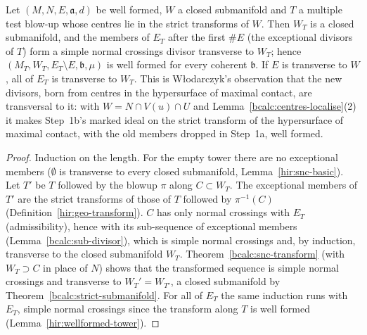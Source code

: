\begin{lemma}
\label{bcalc:exceptional-transverse-tower}
\historicalleanok
Let \((M,N,E,\mathfrak a,d)\) be well formed, \(W\) a closed submanifold and \(T\) a multiple test blow-up whose centres lie in the strict transforms of \(W\).
Then \(W_T\) is a closed submanifold, and the members of \(E_T\) after the first \(\#E\) (the exceptional divisors of \(T\)) form a simple normal crossings
divisor transverse to \(W_T\); hence \((M_T,W_T,E_T\setminus E,\mathfrak b,\mu)\) is well formed for every coherent \(\mathfrak b\). If \(E\) is transverse to \(W\),
all of \(E_T\) is transverse to \(W_T\). This is Włodarczyk's observation that the new divisors, born from centres in the hypersurface of maximal contact,
are transversal to it: with \(W=N\cap V(u)\cap U\) and Lemma~\ref{bcalc:centres-localise}(2) it makes Step~1b's marked ideal on the strict transform of the
hypersurface of maximal contact, with the old members dropped in Step~1a, well formed.
\end{lemma}
\begin{proof}
\historicalleanok
Induction on the length. For the empty tower there are no exceptional members (\(\emptyset\) is transverse to every closed submanifold,
Lemma~\ref{hir:snc-basic}). Let \(T'\) be \(T\) followed by the blowup \(\pi\) along \(C\subset W_T\). The exceptional members of \(T'\) are the strict transforms of
those of \(T\) followed by \(\pi^{-1}(C)\) (Definition~\ref{hir:geo-transform}). \(C\) has only normal crossings with \(E_T\) (admissibility), hence with its
sub-sequence of exceptional members (Lemma~\ref{bcalc:sub-divisor}), which is simple normal crossings and, by induction, transverse to the closed
submanifold \(W_T\). Theorem~\ref{bcalc:snc-transform} (with \(W_T\supset C\) in place of \(N\)) shows that the transformed sequence is simple normal crossings and
transverse to \(W_T'=W_{T'}\), a closed submanifold by Theorem~\ref{bcalc:strict-submanifold}. For all of \(E_T\) the same induction runs with \(E_T\), simple normal
crossings since the transform along \(T\) is well formed (Lemma~\ref{hir:wellformed-tower}).
\end{proof}

